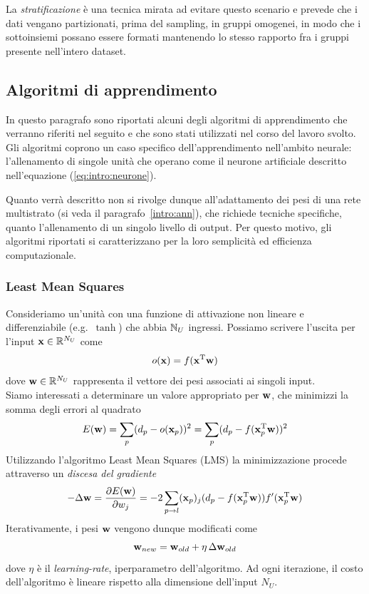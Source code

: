La \emph{stratificazione} è una tecnica mirata ad evitare questo scenario e prevede che i dati vengano partizionati, prima del sampling, in gruppi omogenei, in modo che i sottoinsiemi possano essere formati mantenendo lo stesso rapporto fra i gruppi presente nell'intero dataset. 


\subsection{Algoritmi di apprendimento}\label{intro:alg}
In questo paragrafo sono riportati alcuni degli algoritmi di apprendimento che verranno riferiti nel seguito e che sono stati utilizzati nel corso del lavoro svolto. Gli algoritmi coprono un caso specifico dell'apprendimento nell'ambito neurale: l'allenamento di singole unità che operano come il neurone artificiale descritto nell'equazione (\ref{eq:intro:neurone}).

Quanto verrà descritto non si rivolge dunque all'adattamento dei pesi di una rete multistrato (si veda il paragrafo~\ref{intro:ann}), che richiede tecniche specifiche, quanto l'allenamento di un singolo livello di output. Per questo motivo, gli algoritmi riportati si caratterizzano per la loro semplicità ed efficienza computazionale.

\subsubsection*{Least Mean Squares}
Consideriamo un'unità con una funzione di attivazione non lineare e differenziabile (e.g.\ $\tanh$) che abbia $\mathbb{N}_U$ ingressi. Possiamo scrivere l'uscita per l'input $\mathbf{x} \in \mathbb{R}^{N_U}$ come
\begin{equation}
o(\mathbf{x}) = f(\mathbf{x}^{\mathrm{T}}\mathbf{w})
\end{equation}
dove $\mathbf{w} \in \mathbb{R}^{N_U}$ rappresenta il vettore dei pesi associati ai singoli input.\\
Siamo interessati a determinare un valore appropriato per $\mathbf{w}$, che minimizzi la somma degli errori al quadrato
\begin{equation}\label{eq:lms:error}
E(\mathbf{w}) = \sum_p (d_p - o(\mathbf{x}_p))^2 = \sum_p (d_p - f(\mathbf{x}_p^{\mathrm{T}} \mathbf{w}) )^2 
\end{equation}
Utilizzando l'algoritmo Least Mean Squares (LMS) \cite{Haykin:NN} la minimizzazione procede attraverso un \emph{discesa del gradiente}
\begin{equation}
-\Delta\mathbf{w} = 
\frac{\partial{E(\ensuremath{\mathbf{w}})}}{\partial{w_j}} = 
-2 \sum_{p \rightarrow l } (\mathbf{x}_p)_j 
(d_p - f(\mathbf{x}_p^{\mathrm{T}} \mathbf{w})) f'(\mathbf{x}_p^{\mathrm{T}} \mathbf{w})
\end{equation}
Iterativamente, i pesi $\mathbf{w}$ vengono dunque modificati come
\begin{equation} 
\mathbf{w}_{new} = \mathbf{w}_{old} + \eta\, \Delta\mathbf{w}_{old}
\end{equation}
dove $\eta$ è il \emph{learning-rate}, iperparametro dell'algoritmo. Ad ogni iterazione, il costo dell'algoritmo è lineare rispetto alla dimensione dell'input $N_U$.

